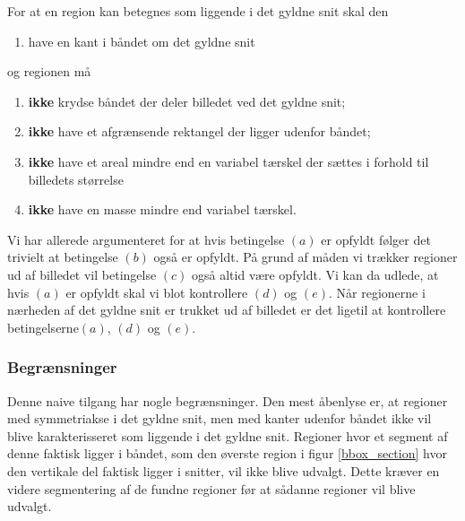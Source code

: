 {\noindent For at en region kan betegnes som liggende i det gyldne snit skal den
\begin{enumerate}
	\renewcommand{\labelenumi}{(\alph{enumi})}
	\item have en kant i båndet om det gyldne snit
\end{enumerate}
og regionen må
\begin{enumerate}
	\renewcommand{\labelenumi}{(\alph{enumi})}
	\setcounter{enumi}{1}
	\item \textbf{ikke} krydse båndet der deler billedet ved det gyldne snit;
	\item \textbf{ikke} have et afgrænsende rektangel der ligger udenfor båndet;
	\item \textbf{ikke} have et areal mindre end en variabel tærskel der sættes i
		forhold til billedets størrelse
	\item \textbf{ikke} have en masse mindre end variabel tærskel.
\end{enumerate}
Vi har allerede argumenteret for at hvis betingelse $(a)$ er opfyldt
følger det trivielt at betingelse $(b)$ også er opfyldt. På grund af
måden vi trækker regioner ud af billedet vil betingelse $(c)$ også altid
være opfyldt. Vi kan da udlede, at hvis $(a)$ er opfyldt skal vi blot
kontrollere $(d)$ og $(e)$. Når regionerne i nærheden af det gyldne snit
er trukket ud af billedet er det ligetil at kontrollere
betingelserne$(a)$, $(d)$ og $(e)$.

\subsubsection{Begrænsninger}
Denne naive tilgang har nogle begrænsninger. Den mest åbenlyse er,
at regioner med symmetriakse i det gyldne snit, men med kanter udenfor
båndet ikke vil blive karakterisseret som liggende i det gyldne snit.
Regioner hvor et segment af denne faktisk ligger i båndet, som den
øverste region i figur \ref{bbox_section} hvor den vertikale del faktisk
ligger i snitter, vil ikke blive udvalgt. Dette kræver en videre
segmentering af de fundne regioner før at sådanne regioner vil blive
udvalgt.

}

